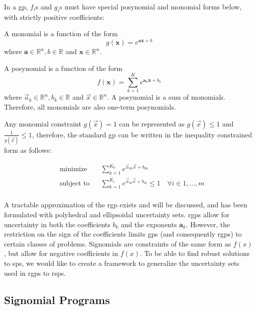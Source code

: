 In a \gls{gp}, $f_{i}$s and $g_{i}$s must have special posynomial and monomial forms below, with strictly positive coefficients:

A monomial is a function of the form
\begin{equation}\label{e:monomial}
g(\mathbf{x}) = e^{\mathbf{a}\mathbf{x} + b}
\end{equation}
where $\mathbf{a} \in \mathbb{R}^n, b \in \mathbb{R}$ and $\mathbf{x} \in \mathbb{R}^n$.

A posynomial is a function of the form
\begin{equation}\label{e:posynomial}
f(\mathbf{x}) = \sum_{k=1}^{K}e^{\mathbf{a}_k\mathbf{x} + b_k}
\end{equation}
where $\vec{a}_k \in \mathbb{R}^n, b_k \in \mathbb{R}$ and $\vec{x} \in \mathbb{R}^n$.
A posynomial is a sum of monomials. Therefore, all monomials are also one-term posynomials.

Any monomial constraint $g(\vec{x}) = 1$ can be represented as $g(\vec{x}) \leq 1$ and $\frac{1}{g(\vec{x})} \leq 1$,
therefore, the standard \gls{gp} can be written in the inequality constrained form as follows:

\begin{equation}
\begin{aligned}
& \text{minimize} && \textstyle{\sum}_{k=1}^{K_0}e^{\vec{a}_{0k}\vec{x} + b_{0k}} \\
& \text{subject to} && \textstyle{\sum}_{k=1}^{K_i}e^{\vec{a}_{ik}\vec{x} + b_{ik}} \leq 1 \quad \forall i \in 1,...,m\\
\end{aligned}
\label{GP_inequality}
\end{equation}

A tractable approximation of the \gls{rgp} exists and will be discussed, and has been formulated with polyhedral
and ellipsoidal uncertainty sets. \gls{rgp}s allow for uncertainty in both the coefficients $b_k$ and the exponents $\mathbf{a}_{k}$.
However, the restriction on the sign of the coefficients limits \gls{gp}s (and consequently \gls{rgp}s) to certain classes of problems.
Signomials are constraints of the same form as $f(x)$, but allow for negative coefficients in $f(x)$.
To be able to find robust solutions to \gls{sp}s, we would like to create a framework to generalize the
uncertainty sets used in \gls{rgp}s to \gls{rsp}s.


\subsection{Signomial Programs}

